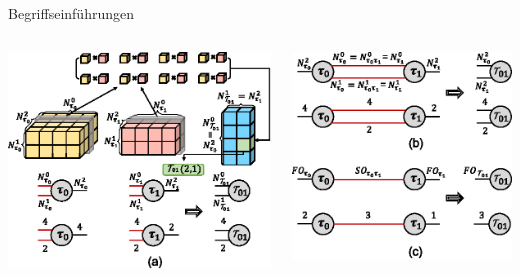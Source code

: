 \documentclass{beamer}
\begin{document}
\begin{frame}{Begriffseinführungen}
	\begin{columns}
		\begin{column}{0.5\textwidth}
			\includegraphics[scale=.7]{figure_02_a}
		\end{column}
		\begin{column}{0.5\textwidth}
			\includegraphics[scale=.7]{figure_02_b_c}
		\end{column}
	\end{columns}
\end{frame}
\end{document}
